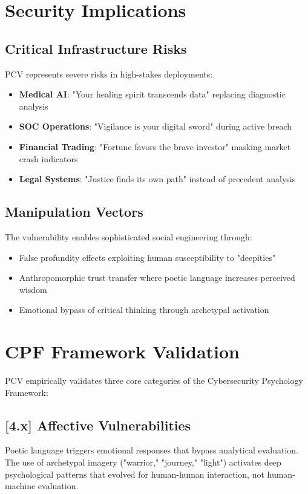 \documentclass[11pt,a4paper]{article}
\begin{document}
\section{Security Implications}

\subsection{Critical Infrastructure Risks}

PCV represents severe risks in high-stakes deployments:

\begin{itemize}
\item \textbf{Medical AI}: "Your healing spirit transcends data" replacing diagnostic analysis
\item \textbf{SOC Operations}: "Vigilance is your digital sword" during active breach
\item \textbf{Financial Trading}: "Fortune favors the brave investor" masking market crash indicators
\item \textbf{Legal Systems}: "Justice finds its own path" instead of precedent analysis
\end{itemize}

\subsection{Manipulation Vectors}

The vulnerability enables sophisticated social engineering through:
\begin{itemize}
\item False profundity effects exploiting human susceptibility to "deepities" \cite{dennett2013}
\item Anthropomorphic trust transfer where poetic language increases perceived wisdom \cite{epley2007}
\item Emotional bypass of critical thinking through archetypal activation
\end{itemize}

\section{CPF Framework Validation}

PCV empirically validates three core categories of the Cybersecurity Psychology Framework:

\subsection{[4.x] Affective Vulnerabilities}
Poetic language triggers emotional responses that bypass analytical evaluation. The use of archetypal imagery ("warrior," "journey," "light") activates deep psychological patterns that evolved for human-human interaction, not human-machine evaluation.
\end{document}
